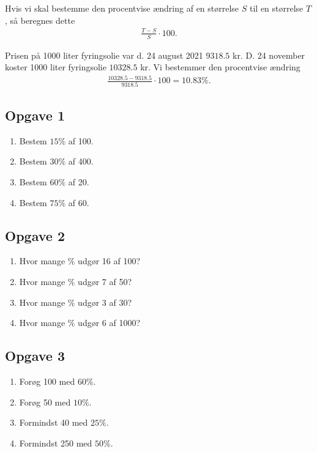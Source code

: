 \begin{regel}[Procentregneregel 4]
Hvis vi skal bestemme den procentvise ændring af en størrelse $S$ til en størrelse $T$, så beregnes dette 
\begin{align*}
\frac{T-S}{S}\cdot 100.
\end{align*}
\end{regel}
\begin{exa}
Prisen på 1000 liter fyringsolie var d. 24 august 2021 $9318.5$ kr. D. 24 november koster 1000 liter fyringsolie $10328.5$ kr. Vi bestemmer den procentvise ændring
\begin{align*}
\frac{10328.5-9318.5}{9318.5}\cdot 100 = 10.83\%. 
\end{align*}
\end{exa}

\subsection*{Opgave 1}

\begin{enumerate}[label=\roman*)]
	\item Bestem $15\%$ af 100.
	\item Bestem $30\%$ af 400.
	\item Bestem $60\%$ af 20.
	\item Bestem $75\%$ af 60.
\end{enumerate}

\subsection*{Opgave 2}

\begin{enumerate}[label=\roman*)]
	\item Hvor mange $\% $ udgør 16 af 100?
	\item Hvor mange $\% $ udgør 7 af 50?
	\item Hvor mange $\% $ udgør 3 af 30?
	\item Hvor mange $\% $ udgør 6 af 1000?
\end{enumerate}

\subsection*{Opgave 3}

\begin{enumerate}[label=\roman*)]
	\item Forøg 100 med $60\%$.
	\item Forøg 50 med $10\%$.
	\item Formindst 40 med $25\%$.
	\item Formindst 250 med $50\%$.
\end{enumerate}

